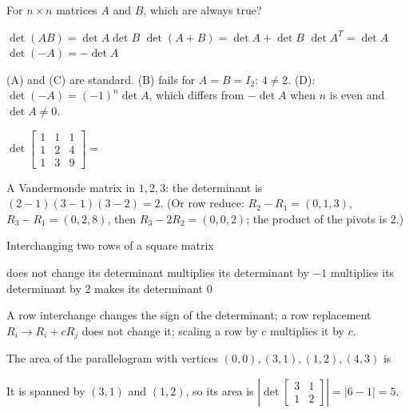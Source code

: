 \begin{question}[id=det-4, type=msq, marks=2]
For $n \times n$ matrices $A$ and $B$, which are always true?
\begin{options}
  \correct $\det(AB) = \det A \det B$
  \option $\det(A + B) = \det A + \det B$
  \correct $\det A^T = \det A$
  \option $\det(-A) = -\det A$
\end{options}
\begin{solution}
(A) and (C) are standard. (B) fails for $A = B = I_2$: $4 \ne 2$. (D): $\det(-A) = (-1)^n \det A$, which differs from $-\det A$ when $n$ is even and $\det A \ne 0$.
\end{solution}
\end{question}

\begin{question}[id=det-5, marks=2]
$\det \begin{bmatrix} 1 & 1 & 1 \\ 1 & 2 & 4 \\ 1 & 3 & 9 \end{bmatrix} =$
\begin{solution}
A Vandermonde matrix in $1, 2, 3$: the determinant is $(2 - 1)(3 - 1)(3 - 2) = 2$. (Or row reduce: $R_2 - R_1 = (0, 1, 3)$, $R_3 - R_1 = (0, 2, 8)$, then $R_3 - 2R_2 = (0, 0, 2)$; the product of the pivots is 2.)
\end{solution}
\end{question}

\begin{question}[id=det-6]
Interchanging two rows of a square matrix
\begin{options}
  \option does not change its determinant
  \correct multiplies its determinant by $-1$
  \option multiplies its determinant by 2
  \option makes its determinant 0
\end{options}
\begin{solution}
A row interchange changes the sign of the determinant; a row replacement $R_i \to R_i + cR_j$ does not change it; scaling a row by $c$ multiplies it by $c$.
\end{solution}
\end{question}

\begin{question}[id=det-7, marks=2]
The area of the parallelogram with vertices $(0, 0), (3, 1), (1, 2), (4, 3)$ is
\begin{options}
\end{options}
\begin{solution}
It is spanned by $(3, 1)$ and $(1, 2)$, so its area is $\left|\det \begin{bmatrix} 3 & 1 \\ 1 & 2 \end{bmatrix}\right| = |6 - 1| = 5$.
\end{solution}
\end{question}

